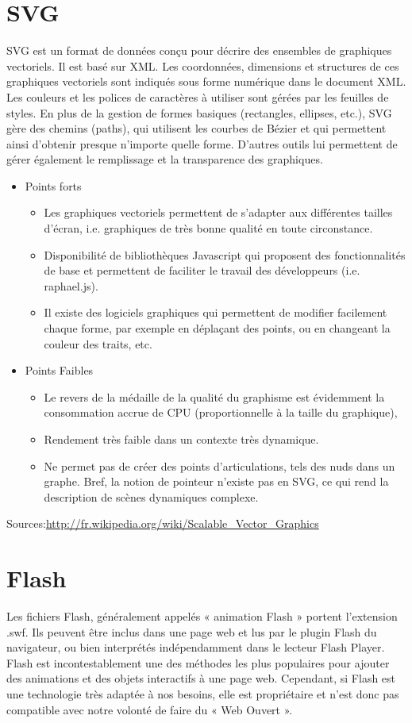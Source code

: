 \documentclass[a4paper,10pt]{report}
\begin{document}
\section{SVG}
SVG est un format de données conçu pour décrire des ensembles de graphiques vectoriels. 
Il est basé sur XML. Les coordonnées, dimensions et structures de ces graphiques 
vectoriels sont indiqués sous forme numérique dans le document XML. 
Les couleurs et les polices de caractères à utiliser sont gérées par 
les feuilles de styles. 
En plus de la gestion de formes basiques (rectangles, ellipses, etc.), SVG gère
 des chemins (paths), qui utilisent les courbes de Bézier et qui permettent ainsi
 d'obtenir presque n'importe quelle forme.  D'autres outils lui permettent de gérer 
également le remplissage et la transparence des graphiques.

\begin{itemize}
\item Points forts
\begin{itemize}
\item Les graphiques vectoriels permettent de s'adapter aux différentes tailles d'écran, 
i.e. graphiques de très bonne qualité en toute circonstance.
\item Disponibilité de bibliothèques Javascript qui proposent des fonctionnalités de base 
et permettent de faciliter le travail des développeurs (i.e. raphael.js).
\item Il existe des logiciels graphiques qui permettent de modifier facilement chaque
 forme, par exemple en déplaçant des points, ou en changeant la couleur des traits, etc.
\end{itemize}
\item Points Faibles
\begin{itemize}
\item Le revers de la médaille de la qualité du graphisme est évidemment la consommation 
accrue de CPU (proportionnelle à la taille du graphique),
\item Rendement très faible dans un contexte très dynamique.
\item Ne permet pas de créer des points d'articulations, tels des nuds dans un graphe. 
Bref, la notion de pointeur n'existe pas en SVG, ce qui rend la description de scènes 
dynamiques complexe.
\end{itemize} 
\end{itemize} 

Sources:\url{http://fr.wikipedia.org/wiki/Scalable_Vector_Graphics}

\section{Flash}
Les fichiers Flash, généralement appelés « animation Flash » portent l'extension .swf. 
Ils peuvent être inclus dans une page web et lus par le plugin Flash du navigateur, ou 
bien interprétés indépendamment dans le lecteur Flash Player. Flash est incontestablement 
une des méthodes les plus populaires pour ajouter des animations et des objets
 interactifs à une page web. 
Cependant, si Flash est une technologie très adaptée à nos besoins, elle est propriétaire
 et n'est donc pas compatible avec notre volonté de faire du « Web Ouvert ».
 
\end{document}
